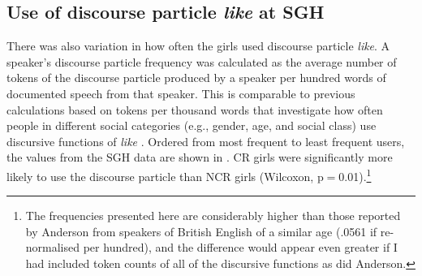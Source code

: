 





\subsection{Use of discourse particle \textit{like} at SGH}\label{section:dplike}

There was also variation in how often the girls used discourse particle \textit{like}. A speaker's discourse particle frequency was calculated as the average number of tokens of the discourse particle produced by a speaker per hundred words of documented speech from that speaker. This is comparable to previous calculations based on tokens per thousand words that investigate how often people in different social categories (e.g., gender, age, and social class) use discursive functions of \textit{like} \citep[287-299]{anderson2001}. Ordered from most frequent to least frequent users, the values from the SGH data are shown in . CR girls were significantly more likely to use the discourse particle than NCR girls (Wilcoxon, p$=$0.01).\footnote{The frequencies presented here are considerably higher than those reported by Anderson from speakers of British English of a similar age (.0561 if re-normalised per hundred), and the difference would appear even greater if I had included token counts of all of the discursive functions as did Anderson.} 


